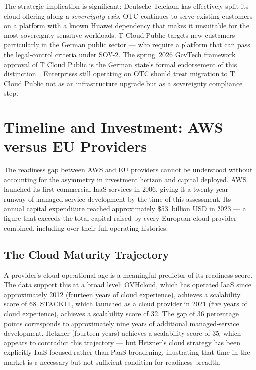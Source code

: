 The strategic implication is significant: Deutsche Telekom has effectively split its cloud offering along a \emph{sovereignty axis}. OTC continues to serve existing customers on a platform with a known Huawei dependency that makes it unsuitable for the most sovereignty-sensitive workloads. T Cloud Public targets new customers — particularly in the German public sector — who require a platform that can pass the legal-control criteria under SOV-2. The spring~2026 GovTech framework approval of T Cloud Public is the German state's formal endorsement of this distinction~\cite{Kramer_PersonalComm_2026}. Enterprises still operating on OTC should treat migration to T Cloud Public not as an infrastructure upgrade but as a sovereignty compliance step.

\section{Timeline and Investment: AWS versus EU Providers}
\label{sec:timeline_investment}

The readiness gap between AWS and EU providers cannot be understood without accounting for the asymmetry in investment horizon and capital deployed. AWS launched its first commercial IaaS services in 2006, giving it a twenty-year runway of managed-service development by the time of this assessment. Its annual capital expenditure reached approximately \$53~billion USD in 2023 — a figure that exceeds the total capital raised by every European cloud provider combined, including over their full operating histories.

\subsection{The Cloud Maturity Trajectory}

A provider's cloud operational age is a meaningful predictor of its readiness score. The data support this at a broad level: OVHcloud, which has operated IaaS since approximately 2012 (fourteen years of cloud experience), achieves a scalability score of 68; STACKIT, which launched as a cloud provider in 2021 (five years of cloud experience), achieves a scalability score of 32. The gap of 36 percentage points corresponds to approximately nine years of additional managed-service development. Hetzner (fourteen years) achieves a scalability score of 35, which appears to contradict this trajectory — but Hetzner's cloud strategy has been explicitly IaaS-focused rather than PaaS-broadening, illustrating that time in the market is a necessary but not sufficient condition for readiness breadth.

